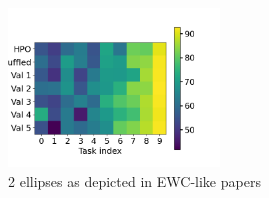 \documentclass[11pt]{article}
\begin{document}
\begin{figure}
    \centering
    \includegraphics[width=0.5\textwidth]{images/val_accs_matrix_greedy_HPO_GroHess_from_output_pMNIST_via_torch_standard_2024-07-16_20-54-00.png}
    \caption{2 ellipses as depicted in EWC-like papers}
    \label{fig:best_params}
\end{figure}
\end{document}
